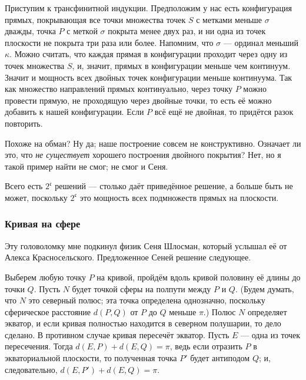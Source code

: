 Приступим к трансфинитной индукции.
Предположим у нас есть конфигурация прямых, покрывающая все точки множества точек $S$ с метками меньше $\sigma$ дважды,
точка $P$ с меткой $\sigma$ покрыта менее двух раз,
и ни одна из точек плоскости не покрыта три раза или более.
Напомним, что $\sigma$ --- ординал меньший $\kappa$.
Можно считать, что каждая прямая в конфигурации проходит через одну из точек множества $S$, 
и, значит, прямых в конфигурации меньше чем континуум.
Значит и мощность всех двойных точек конфигурации меньше континуума.
Так как множество направлений прямых континуально, через точку $P$ можно провести прямую, не проходящую через двойные точки,
то есть её можно добавить к нашей конфигурации.
Если $P$ всё ещё не двойная, то придётся разок повторить.

Похоже на обман?
Ну да; наше построение совсем не конструктивно.
Означает ли это, что \emph{не существует} хорошего построения двойного покрытия?
Нет, но я такой пример найти не смог; не смог и Сеня.

\begin{addedbytheeditors}
Всего есть $2^{\mathfrak{c}}$ решений --- столько даёт приведённое решение, а больше быть не может, поскольку $2^{\mathfrak{c}}$ это мощность всех подмножеств прямых на плоскости.\pr
\end{addedbytheeditors}


\subsubsection*{Кривая на сфере}

Эту головоломку мне подкинул физик Сеня Шлосман, который услышал её от Алекса Красносельского.
Предложенное Сеней решение следующее.

Выберем любую точку $P$ на кривой, пройдём вдоль кривой половину её длины до точки $Q$.
Пусть $N$ будет точкой сферы на полпути между $P$ и $Q$.
(Будем думать, что $N$ это северный полюс; эта точка определена однозначно, поскольку сферическое расстояние $d(P, Q)$ от $P$ до $Q$ меньше $\pi$.)
Полюс $N$ определяет экватор, и если кривая полностью находится в северном полушарии, то дело сделано.
В противном случае кривая пересечёт экватор.
Пусть $E$ --- одна из точек пересечения.
Тогда $d(E,P) + d(E,Q) = \pi$, ведь если отразить $P$ в экваториальной плоскости, то полученная точка $P'$ будет антиподом $Q$; и, следовательно, $d(E, P') + d(E, Q) = \pi$.

